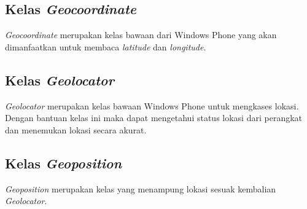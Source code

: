 \subsection{Kelas \textit{Geocoordinate}}
\label{lab:Kelas Geocoordinate}
\hspace{0.5cm} \textit{Geocoordinate} merupakan kelas bawaan dari Windows Phone yang akan dimanfaatkan untuk membaca \textit{latitude} dan \textit{longitude}.

\subsection{Kelas \textit{Geolocator}}
\label{lab:Kelas Geolocator}
\hspace{0.5cm} \textit{Geolocator} merupakan kelas bawaan Windows Phone untuk mengkases lokasi. Dengan bantuan kelas ini maka dapat mengetahui status lokasi dari perangkat dan menemukan lokasi secara akurat.

\subsection{Kelas \textit{Geoposition}}
\label{lab:Kelas Geoposition}
\hspace{0.5cm} \textit{Geoposition} merupakan kelas yang menampung lokasi sesuak kembalian \textit{Geolocator}.

